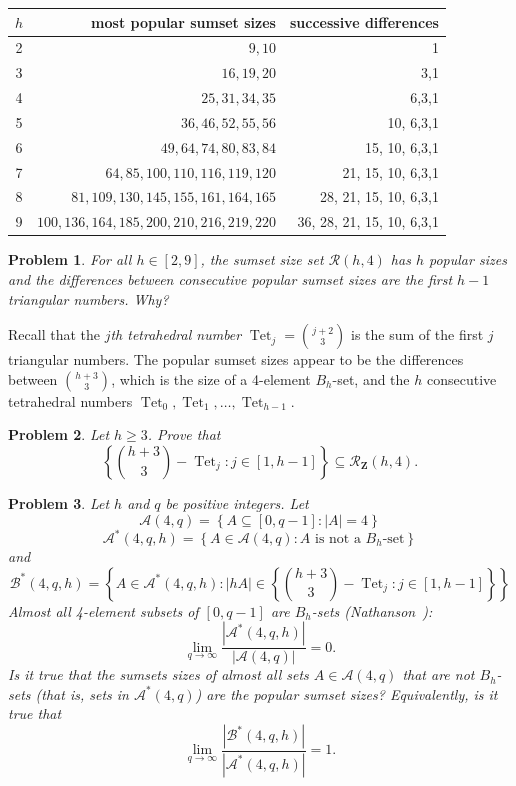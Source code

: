 \documentclass{amsart}
\newtheorem{problem}{Problem}
\newcommand{\bprob}{\begin{problem}}
\newcommand{\eprob}{\end{problem}}
\newcommand{\Z}{\ensuremath{\mathbf Z}}
\newcommand{\mca}{\ensuremath{ \mathcal A}}
\newcommand{\mcb}{\ensuremath{ \mathcal B}}
\newcommand{\mcr}{\ensuremath{ \mathcal R}}
\DeclareMathOperator{\Tet}{\text{Tet}}
\begin{document}
\begin{center}
\begin{tabular}{c|r|r}
$h$  & most popular sumset sizes & successive differences  \\ \hline
2 &      $   9, 10  $ & 1 \\ 
3 &      $    16,19, 20 $ &  3,1\\            
4 &     $    25,  31, 34, 35  $ & 6,3,1 \\
5 & $ 36, 46, 52, 55, 56 $ & 10, 6,3,1  \\
6 &  $49, 64, 74, 80, 83, 84 $& 15, 10, 6,3,1 \\
7 &   $ 64, 85, 100, 110, 116, 119, 120 $ & 21, 15, 10, 6,3,1   \\
8 & $   81, 109, 130, 145, 155, 161, 164, 165  $   & 28, 21, 15, 10, 6,3,1     \\
9 &     $   100, 136, 164, 185, 200, 210, 216, 219, 220 $   & 36, 28, 21, 15, 10, 6,3,1 \\  
\end{tabular}
\end{center}

\bprob
For all $h \in [2,9]$, the sumset size set $\mcr(h,4)$
 has $h$ popular sizes and the differences between consecutive 
 popular sumset sizes are the first $h-1$ 
triangular numbers.  Why? 
\eprob

Recall that the \emph{$j$th tetrahedral number} 
$\Tet_j = \binom{j+2}{3}$ is the sum of the first $j$ triangular numbers.  
The popular sumset sizes appear to be 
the differences between  $\binom{h+3}{3}$, 
which is the size of a 4-element 
$B_h$-set, and the $h$ consecutive tetrahedral numbers 
$\Tet_0,  \Tet_1,\ldots,  \Tet_{h-1}$. 

\bprob
Let $h \geq 3$.  
Prove that 
\[
\left\{ \binom{h+3}{3} - \Tet_j : j \in [1,h-1]\right\}  
\subseteq \mcr_{\Z}(h,4). 
\]
\eprob

\bprob
Let $h$ and $q$ be positive integers.  
Let 
\[
\mca(4,q) = \left\{ A \subseteq [0,q-1]: |A| = 4  \right\} 
\]
\[
\mca^*(4,q,h) = \left\{ A \in \mca(4,q):
\text{$A$ is not a $B_h$-set} \right\} 
\]
and 
\[
\mcb^*(4,q,h ) = \left\{ A \in \mca^*(4,q,h ) :
 |hA| \in \left\{ \binom{h+3}{3} - \Tet_j : j \in [1,h-1]\right\}  \right\} 
\]
Almost all 4-element subsets of $[0,q-1]$ are $B_h$-sets (Nathanson~\cite{nath-ubiq,nath-Canada}):
\[
\lim_{q\rightarrow \infty} \frac{| \mca^*(4,q,h) |}{|\mca(4,q) |} = 0.
\]
Is it true that the sumsets sizes of almost all sets $A \in \mca(4,q)$ that 
are not $B_h$-sets  (that is, sets in $\mca^*(4,q)$) are the popular sumset sizes?  Equivalently, is it true that 
\[
\lim_{q\rightarrow \infty} \frac{| \mcb^*(4,q,h) |}{|\mca^*(4,q,h) |} = 1.
\]
\eprob
\end{document}
